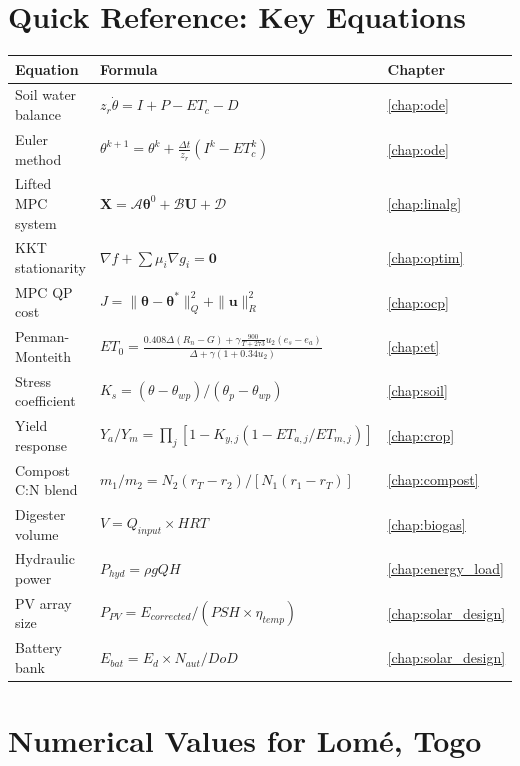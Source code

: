 \documentclass[12pt,a4paper,openany]{book}
\newcommand{\bu}{\bm{u}}
\newcommand{\bth}{\bm{\theta}}
\begin{document}
\appendix

\chapter{Quick Reference: Key Equations}
\label{app:equations}

\begin{table}[H]
\centering
\renewcommand{\arraystretch}{1.6}
\begin{tabular}{lll}
\toprule
\textbf{Equation}&\textbf{Formula}&\textbf{Chapter}\\
\midrule
Soil water balance & $z_r\dot\theta = I+P-ET_c-D$ & \ref{chap:ode}\\
Euler method & $\theta^{k+1}=\theta^k+\frac{\Delta t}{z_r}(I^k-ET_c^k)$ & \ref{chap:ode}\\
Lifted MPC system & $\mathbf{X}=\mathcal{A}\bth^0+\mathcal{B}\mathbf{U}+\mathcal{D}$ & \ref{chap:linalg}\\
KKT stationarity & $\nabla f+\sum\mu_i\nabla g_i=\bm{0}$ & \ref{chap:optim}\\
MPC QP cost & $J=\|\bth-\bth^*\|_Q^2+\|\bu\|_R^2$ & \ref{chap:ocp}\\
Penman-Monteith & $ET_0=\frac{0.408\Delta(R_n-G)+\gamma\frac{900}{T+273}u_2(e_s-e_a)}{\Delta+\gamma(1+0.34u_2)}$ & \ref{chap:et}\\
Stress coefficient & $K_s=(\theta-\theta_{wp})/(\theta_p-\theta_{wp})$ & \ref{chap:soil}\\
Yield response & $Y_a/Y_m=\prod_j[1-K_{y,j}(1-ET_{a,j}/ET_{m,j})]$ & \ref{chap:crop}\\
Compost C:N blend & $m_1/m_2=N_2(r_T-r_2)/[N_1(r_1-r_T)]$ & \ref{chap:compost}\\
Digester volume & $V=Q_{input}\times HRT$ & \ref{chap:biogas}\\
Hydraulic power & $P_{hyd}=\rho g Q H$ & \ref{chap:energy_load}\\
PV array size & $P_{PV}=E_{corrected}/(PSH\times\eta_{temp})$ & \ref{chap:solar_design}\\
Battery bank & $E_{bat}=E_d\times N_{aut}/DoD$ & \ref{chap:solar_design}\\
\bottomrule
\end{tabular}
\end{table}

\chapter{Numerical Values for Lomé, Togo}
\label{app:values}
\end{document}
